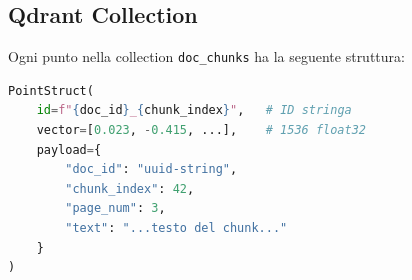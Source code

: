 \subsection{Qdrant Collection}

Ogni punto nella collection \texttt{doc\_chunks} ha la seguente struttura:

\begin{lstlisting}[language=Python, caption=Struttura punto Qdrant]
PointStruct(
    id=f"{doc_id}_{chunk_index}",   # ID stringa
    vector=[0.023, -0.415, ...],    # 1536 float32
    payload={
        "doc_id": "uuid-string",
        "chunk_index": 42,
        "page_num": 3,
        "text": "...testo del chunk..."
    }
)
\end{lstlisting}
